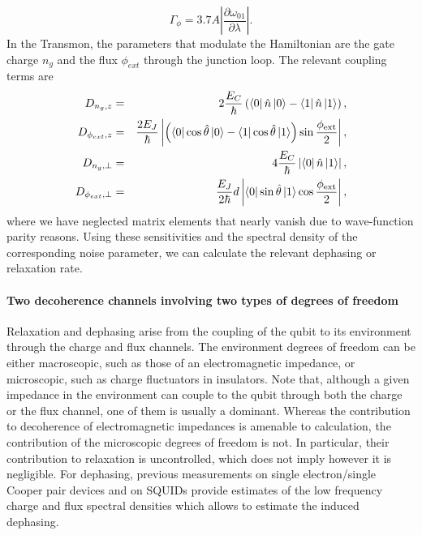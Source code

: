 %
\begin{equation}
\Gamma_\phi =3.7A \left|\frac{\partial \omega_{01}}{\partial \lambda}\right|.
\end{equation}
%
In the Transmon, the  parameters  that  modulate the Hamiltonian are the gate charge $n_g$ and the flux $\phi_{ext}$ through the junction loop. The relevant coupling terms are  
\begin{eqnarray}
D_{n_g,z} & = & 2\frac{E_C}{\hbar}\left(\left< 0 \right|\hat{n}\left| 0 \right>-\left< 1 \right|\hat{n}\left| 1 \right>\right), \\
D_{\phi_{ext},z} & = & \frac{2 E_J}{\hbar}\left|\left(\left< 0 \right|\cos{\hat{\theta}}\left| 0 \right>-\left< 1 \right|\cos{\hat{\theta}}\left| 1 \right>\right)\sin{\frac{\phi_{\mathrm{ext}}}{2}}\right|, \\
D_{n_g,\perp} & = & 4\frac{E_C}{\hbar}\left|\left< 0 \right|\hat{n}\left| 1 \right>\right|, \\
D_{\phi_{ext},\perp} & = & \frac{E_J}{2\hbar}d\left|\left< 0 \right|\sin{\hat{\theta}}\left| 1 \right>\cos{\frac{\phi_{\mathrm{ext}}}{2}}\right|, \label{eq:flux_relaxation_sensitivity}
\end{eqnarray}
%
where we have neglected matrix elements that nearly vanish due to wave-function parity reasons.
 Using these sensitivities and the spectral density of the corresponding noise parameter, we can 
calculate the relevant dephasing or relaxation rate.

\paragraph{Two decoherence channels involving two types  of degrees of freedom}
 Relaxation and dephasing arise from the coupling of the qubit to its environment through   the charge  and  flux channels. The environment  degrees of freedom can be either 
 macroscopic, such as those of  an electromagnetic  impedance, or microscopic, such as charge fluctuators in insulators. Note  that, although  a given impedance in the 
environment can   couple to the qubit  through  both  the charge or the flux channel, one of them is usually a dominant.
 Whereas the contribution to decoherence of  electromagnetic impedances   is amenable to calculation, 
 the contribution of the microscopic degrees of freedom is not. In particular, their contribution   to relaxation is
 uncontrolled, which does not imply however it is negligible. For dephasing, previous   measurements  on single electron/single Cooper pair devices and on SQUIDs  provide  estimates of the low frequency 
charge and flux spectral densities which  allows to estimate  the induced dephasing.     
 
